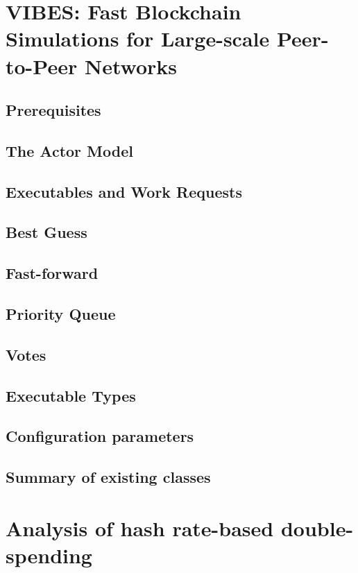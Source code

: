 \section{VIBES: Fast Blockchain Simulations for Large-scale Peer-to-Peer
Networks}

\subsection{Prerequisites}
\subsection{The Actor Model}
\subsection{Executables and Work Requests}
\subsection{Best Guess}
\subsection{Fast-forward}
\subsection{Priority Queue}
\subsection{Votes}
\subsection{Executable Types}
\subsection{Configuration parameters}

\subsection{Summary of existing classes}

\section{Analysis of hash rate-based double-spending}
